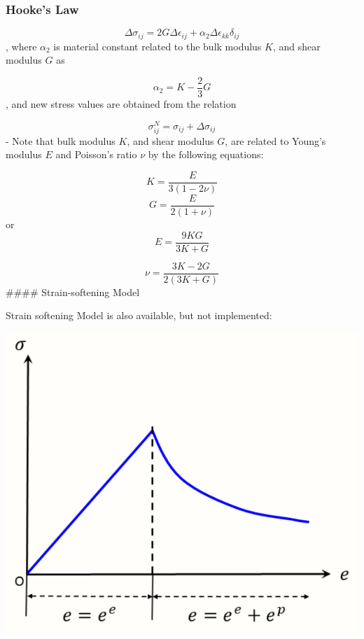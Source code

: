 \documentclass[a4paper, nobind]{templates/ociamthesis}
\begin{document}
\hypertarget{hookes-law}{%
\subsubsection{Hooke's Law}\label{hookes-law}}

\[ \Delta \sigma_{ij} = 2 G \Delta \epsilon_{ij} + \alpha_2 \Delta \epsilon_{kk} \delta_{ij}\]
, where \(\alpha_2\) is material constant related to the bulk modulus \(K\), and shear modulus \(G\) as

\[ \alpha_2 = K - \frac{2}{3} G\]
, and new stress values are obtained from the relation

\[ \sigma_{ij}^{N} = \sigma_{ij} + \Delta \sigma_{ij}\]
- Note that bulk modulus \(K\), and shear modulus \(G\), are related to Young's modulus \(E\) and Poisson's ratio \(\nu\) by the following equations:

\[ K = \frac{E}{3(1-2 \nu)}\]
\[ G = \frac{E}{2(1+ \nu)}\]
or
\[ E = \frac{9 K G}{3K + G}\]

\[ \nu = \frac{3 K - 2 G}{2(3 K + G)}\]
\#\#\#\# Strain-softening Model

Strain softening Model is also available, but not implemented:

\includegraphics[width=1\linewidth]{myfigureeeeee/softening}
\end{document}
